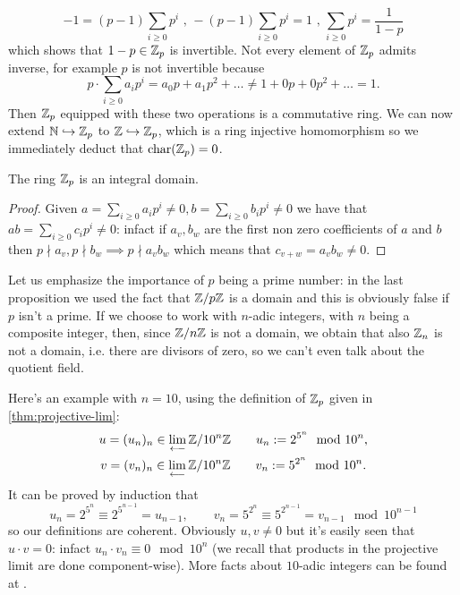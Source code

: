 		\begin{equation*}
			-1 = (p-1)\sum_{i\geq 0}p^i \textrm{ ,  } -(p-1)\sum_{i\geq 0}p^i = 1 \textrm{ ,  } \sum_{i\geq 0}p^i = \frac{1}{1 - p}
		\end{equation*}
		which shows that $1-p \in \mathbb{Z}_p$ is invertible. Not every element of $\mathbb{Z}_p$ admits inverse, for example $p$ is not invertible because
		\begin{equation*}
			p \cdot \sum_{i\geq 0}a_ip^i = a_0p + a_1p^2 + \dots \neq 1 + 0p + 0p^2 + \dots = 1.
		\end{equation*}
		Then $\mathbb{Z}_p$ equipped with these two operations is a commutative ring. We can now extend $\mathbb{N} \hookrightarrow \mathbb{Z}_p$ to $\mathbb{Z} \hookrightarrow \mathbb{Z}_p$, which is a ring injective homomorphism so we immediately deduct that $\textrm{char}(\mathbb{Z}_p) = 0$.
		\begin{prop}						
			The ring $\mathbb{Z}_p$ is an integral domain.
		\end{prop}
		\begin{proof}
			Given $a = \sum_{i \geq 0}a_ip^i \neq 0, b = \sum_{i\geq 0}b_ip^i \neq 0$ we have that $ab = \sum_{i\geq 0}c_ip^i \neq 0$: infact if $a_v, b_w$ are the first non zero coefficients of $a$ and $b$ then $p \nmid a_v, p \nmid b_w \implies p \nmid a_vb_w$ which means that $c_{v+w} = a_vb_w \neq 0$.
		\end{proof}
		Let us emphasize the importance of $p$ being a prime number: in the last proposition we used the fact that $\mathbb{Z}/p\mathbb{Z}$ is a domain and this is obviously false if $p$ isn't a prime. If we choose to work with $n$-adic integers, with $n$ being a composite integer, then, since $\mathbb{Z}/n\mathbb{Z}$ is not a domain, we obtain that also $\mathbb{Z}_n$ is not a domain, i.e. there are divisors of zero, so we can't even talk about the quotient field. 
		\begin{example}
			Here's an example with $n = 10$, using the definition of $\mathbb{Z}_p$ given in \cref{thm:projective-lim}:
			\begin{gather*}
				u = (u_n)_n \in \lim_{\longleftarrow} \mathbb{Z}/10^n\mathbb{Z} \qquad u_n := 2^{5^n} \mod 10^n, \\
				v = (v_n)_n \in \lim_{\longleftarrow} \mathbb{Z}/10^n\mathbb{Z} \qquad v_n := 5^{2^n} \mod 10^n.
			\end{gather*}
			It can be proved by induction that
			\[
				u_n = 2^{5^n} \equiv 2^{5^{n-1}} = u_{n-1}, \qquad v_n = 5^{2^n} \equiv 5^{2^{n-1}} = v_{n-1} \mod 10^{n-1}
			\]
			so our definitions are coherent. Obviously $u, v \neq 0$ but it's easily seen that $u \cdot v = 0$: infact $u_n \cdot v_n \equiv 0 \mod 10^n$ (we recall that products in the projective limit are done component-wise). More facts about $10$-adic integers can be found at \cite{michon:padic-arithmetic}.
		\end{example}

